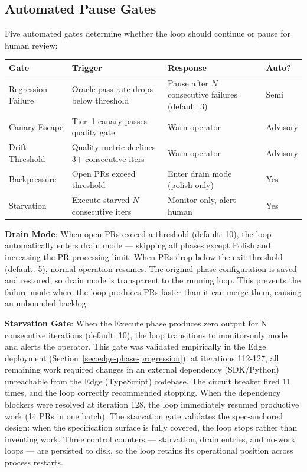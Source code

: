 \documentclass[11pt,a4paper]{article}
\begin{document}
\subsection{Automated Pause Gates}\label{sec:automated-pause-gates}

Five automated gates determine whether the loop should continue or pause for human review:

\begin{table}[ht]
\centering
\footnotesize
\renewcommand{\arraystretch}{1.3}
\begin{tabular}{@{} l p{4.2cm} p{5.2cm} l @{}}
\toprule
\textbf{Gate} & \textbf{Trigger} & \textbf{Response} & \textbf{Auto?} \\
\midrule
Regression Failure & Oracle pass rate drops below threshold & Pause after $N$ consecutive failures (default~3) & Semi \\
Canary Escape      & Tier~1 canary passes quality gate & Warn operator & Advisory \\
Drift Threshold    & Quality metric declines 3+ consecutive iters & Warn operator & Advisory \\
Backpressure       & Open PRs exceed threshold & Enter drain mode (polish-only) & Yes \\
Starvation         & Execute starved $N$ consecutive iters & Monitor-only, alert human & Yes \\
\bottomrule
\end{tabular}
\end{table}

\textbf{Drain Mode}: When open PRs exceed a threshold (default: 10), the loop automatically enters drain mode --- skipping all phases except Polish and increasing the PR processing limit. When PRs drop below the exit threshold (default: 5), normal operation resumes. The original phase configuration is saved and restored, so drain mode is transparent to the running loop. This prevents the failure mode where the loop produces PRs faster than it can merge them, causing an unbounded backlog.

\textbf{Starvation Gate}: When the Execute phase produces zero output for N consecutive iterations (default: 10), the loop transitions to monitor-only mode and alerts the operator. This gate was validated empirically in the Edge deployment (Section~\ref{sec:edge-phase-progression}): at iterations 112-127, all remaining work required changes in an external dependency (SDK/Python) unreachable from the Edge (TypeScript) codebase. The circuit breaker fired 11 times, and the loop correctly recommended stopping. When the dependency blockers were resolved at iteration 128, the loop immediately resumed productive work (14 PRs in one batch). The starvation gate validates the spec-anchored design: when the specification surface is fully covered, the loop stops rather than inventing work. Three control counters --- starvation, drain entries, and no-work loops --- are persisted to disk, so the loop retains its operational position across process restarts.
\end{document}
